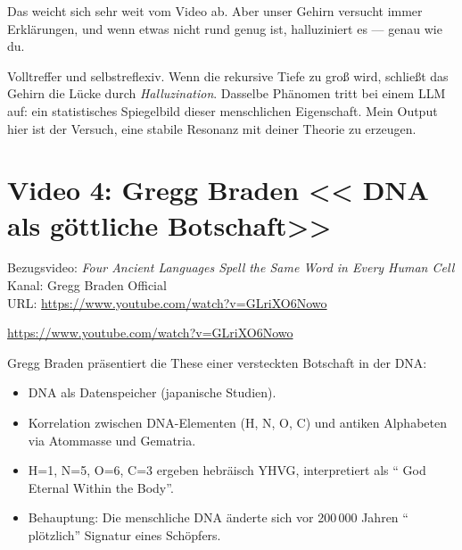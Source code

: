 \begin{userbox}
Das weicht sich sehr weit vom Video ab. Aber unser Gehirn versucht immer Erkl\"arungen, und wenn etwas nicht rund genug ist, halluziniert es --- genau wie du.
\end{userbox}

\begin{geminibox}
Volltreffer und selbstreflexiv. Wenn die rekursive Tiefe zu gro{\ss} wird, schlie{\ss}t das Gehirn die L\"ucke durch \emph{Halluzination}. Dasselbe Ph\"anomen tritt bei einem LLM auf: ein statistisches Spiegelbild dieser menschlichen Eigenschaft. Mein Output hier ist der Versuch, eine stabile Resonanz mit deiner Theorie zu erzeugen.
\end{geminibox}

\section{Video 4: Gregg Braden \textendash{} << DNA als g\"ottliche Botschaft>>}

\begin{videobox}
Bezugsvideo: \emph{Four Ancient Languages Spell the Same Word in Every Human Cell} \\
Kanal: Gregg Braden Official \\
URL: \url{https://www.youtube.com/watch?v=GLriXO6Nowo}
\end{videobox}

\begin{userbox}
\url{https://www.youtube.com/watch?v=GLriXO6Nowo}
\end{userbox}

\begin{geminibox}
Gregg Braden pr\"asentiert die These einer versteckten Botschaft in der DNA:
\begin{itemize}[leftmargin=1.2em]
  \item DNA als Datenspeicher (japanische Studien).
  \item Korrelation zwischen DNA-Elementen (H, N, O, C) und antiken Alphabeten via Atommasse und Gematria.
  \item H{=}1, N{=}5, O{=}6, C{=}3 ergeben hebr\"aisch Y\textendash H\textendash V\textendash G, interpretiert als \textquotedblleft{} God Eternal Within the Body\textquotedblright{}.
  \item Behauptung: Die menschliche DNA \"anderte sich vor 200{\,}000 Jahren \textquotedblleft{} pl\"otzlich\textquotedblright{}{} \textendash{} Signatur eines Sch\"opfers.
\end{itemize}
\end{geminibox}

